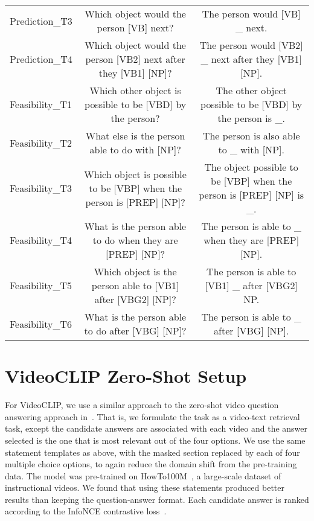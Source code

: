 \begin{landscape}
\begin{table}[htpb]
\begin{tabular}{lcc}
        Prediction\_T3 & Which object would the person [VB] next? & The person would [VB] \_ next. \\
        Prediction\_T4 & Which object would the person [VB2] next after they [VB1] [NP]? & The person would [VB2] \_ next after they [VB1] [NP]. \\
        \midrule
        Feasibility\_T1 & Which other object is possible to be [VBD] by the person? & The other object possible to be [VBD] by the person is \_. \\
        Feasibility\_T2 & What else is the person able to do with [NP]? & The person is also able to \_ with [NP]. \\
        Feasibility\_T3 & Which object is possible to be [VBP] when the person is [PREP] [NP]? & The object possible to be [VBP] when the person is [PREP] [NP] is \_. \\
        Feasibility\_T4 & What is the person able to do when they are [PREP] [NP]? & The person is able to \_ when they are [PREP] [NP]. \\
        Feasibility\_T5 & Which object is the person able to [VB1] after [VBG2] [NP]? & The person is able to [VB1] \_ after [VBG2] NP. \\
        Feasibility\_T6 & What is the person able to do after [VBG] [NP]? & The person is able to \_ after [VBG] [NP]. \\
        \bottomrule
    \end{tabular}
\end{table}
\end{landscape}
\normalsize

\section{VideoCLIP Zero-Shot Setup}
\label{sec:videoclip_zs}

For VideoCLIP, we use a similar approach to the zero-shot video question
answering approach in~\citet{xu2021videoclip}. That is, we formulate the task
as a video-text retrieval task, except the candidate answers are associated
with each video and the answer selected is the one that is most relevant out of
the four options. We use the same statement templates as above, with the masked
section replaced by each of four multiple choice options, to again reduce the
domain shift from the pre-training data. The model was pre-trained on
HowTo100M~\citep{miech2019howto100m}, a large-scale dataset of instructional
videos. We found that using these statements produced better results than
keeping the question-answer format. Each candidate answer is ranked according
to the InfoNCE contrastive loss~\citep{oord2019infonce}.

